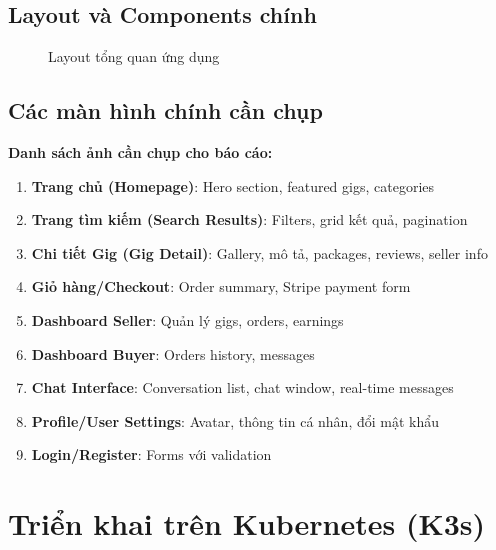 \documentclass[12pt]{extreport}
\begin{document}
\subsection{Layout và Components chính}

\begin{figure}[H]
    \centering
    \caption{Layout tổng quan ứng dụng}
    \label{fig:layout}
\end{figure}

\subsection{Các màn hình chính cần chụp}

\textbf{Danh sách ảnh cần chụp cho báo cáo:}

\begin{enumerate}
    \item \textbf{Trang chủ (Homepage)}: Hero section, featured gigs, categories
    \item \textbf{Trang tìm kiếm (Search Results)}: Filters, grid kết quả, pagination
    \item \textbf{Chi tiết Gig (Gig Detail)}: Gallery, mô tả, packages, reviews, seller info
    \item \textbf{Giỏ hàng/Checkout}: Order summary, Stripe payment form
    \item \textbf{Dashboard Seller}: Quản lý gigs, orders, earnings
    \item \textbf{Dashboard Buyer}: Orders history, messages
    \item \textbf{Chat Interface}: Conversation list, chat window, real-time messages
    \item \textbf{Profile/User Settings}: Avatar, thông tin cá nhân, đổi mật khẩu
    \item \textbf{Login/Register}: Forms với validation
\end{enumerate}

\section{Triển khai trên Kubernetes (K3s)}
\end{document}
